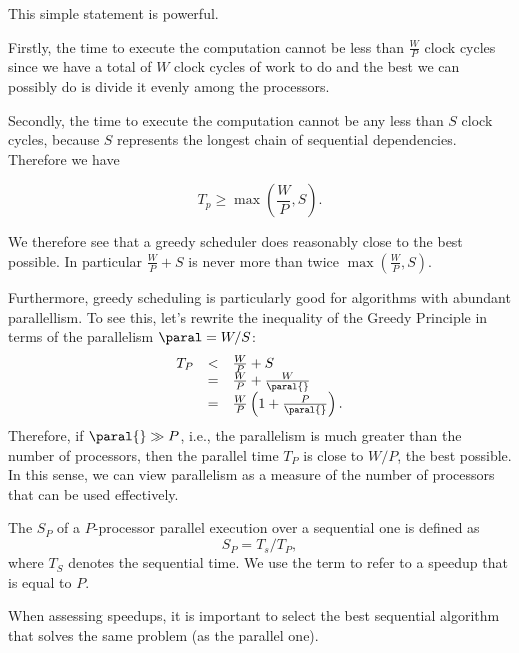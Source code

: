 \begin{cluster}
\label{grp:grm:analysis::models::optimality-of-greedy-schedulers}

\begin{gram}
\label{grm:analysis::models::optimality-of-greedy-schedulers}
This simple statement is powerful. 

Firstly, the time to execute the computation cannot be less than
$\frac{W}{P}$ clock cycles since we have a total of $W$ clock cycles
of work to do and the best we can possibly do is divide it evenly
among the processors.

Secondly, the time to execute the computation cannot be any less than
$S$ clock cycles, because $S$ represents the longest chain of
sequential dependencies.  Therefore we have

\[
T_p \geq \max{}\left(\frac{W}{P},S\right).
\]

We therefore see that a greedy scheduler does reasonably close to the
best possible.  In particular $\frac{W}{P} + S$ is never more than
twice $\max{}(\frac{W}{P},S)$.


Furthermore, greedy scheduling is particularly good for algorithms
with abundant parallellism.  To see this, let's rewrite the inequality
of the Greedy Principle
in terms of the parallelism $\paral = W/S$:
\[
\begin{array}{lll}
T_P & < & \frac{W}{P} + S \\
    & = &  \frac{W}{P} + \frac{W}{\paral{}}\\
    & = &  \frac{W}{P}\left(1 + \frac{P}{\paral{}}\right).
\end{array}
\]
Therefore, if $\paral{} \gg P$, i.e., the parallelism is much greater
than the number of processors, then the parallel time $T_P$ is close
to $W/P$, the best possible.  In this sense, we can view parallelism
as a measure of the number of processors that can be used effectively.

\end{gram}
\end{cluster}

\begin{cluster}
\label{grp:def:analysis::models::speedup}

\begin{definition}[Speedup]
\label{def:analysis::models::speedup}
The  $S_P$ of a $P$-processor parallel execution over a
sequential one is defined as
\[
S_P = T_s / T_P, 
\]
where $T_S$ denotes the sequential time.
We use the term  to refer to a speedup that is
equal to $P$.

When assessing speedups, it is important to select the best sequential
algorithm that solves the same problem (as the parallel one).  

\end{definition}
\end{cluster}

